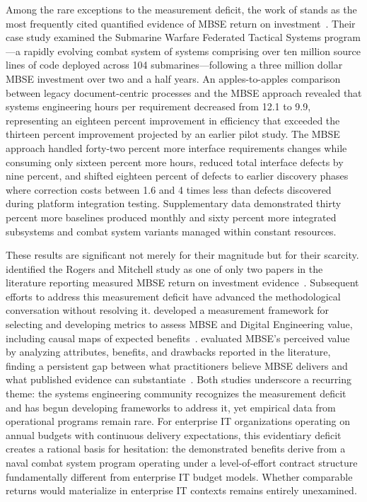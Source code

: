 Among the rare exceptions to the measurement deficit, the work of \citeauthor{Rogers_Mitchell_2021} stands as the most frequently cited quantified evidence of MBSE return on investment~\parencite{Rogers_Mitchell_2021}. Their case study examined the Submarine Warfare Federated Tactical Systems program---a rapidly evolving combat system of systems comprising over ten million source lines of code deployed across 104 submarines---following a three million dollar MBSE investment over two and a half years. An apples-to-apples comparison between legacy document-centric processes and the MBSE approach revealed that systems engineering hours per requirement decreased from 12.1 to 9.9, representing an eighteen percent improvement in efficiency that exceeded the thirteen percent improvement projected by an earlier pilot study. The MBSE approach handled forty-two percent more interface requirements changes while consuming only sixteen percent more hours, reduced total interface defects by nine percent, and shifted eighteen percent of defects to earlier discovery phases where correction costs between 1.6 and 4 times less than defects discovered during platform integration testing. Supplementary data demonstrated thirty percent more baselines produced monthly and sixty percent more integrated subsystems and combat system variants managed within constant resources.

These results are significant not merely for their magnitude but for their scarcity. \citeauthor{Henderson_Salado_2021} identified the Rogers and Mitchell study as one of only two papers in the literature reporting measured MBSE return on investment evidence~\parencite{Henderson_Salado_2021}. Subsequent efforts to address this measurement deficit have advanced the methodological conversation without resolving it. \citeauthor{Henderson_2023_Metrics} developed a measurement framework for selecting and developing metrics to assess MBSE and Digital Engineering value, including causal maps of expected benefits~\parencite{Henderson_2023_Metrics}. \citeauthor{Campo_2023} evaluated MBSE's perceived value by analyzing attributes, benefits, and drawbacks reported in the literature, finding a persistent gap between what practitioners believe MBSE delivers and what published evidence can substantiate~\parencite{Campo_2023}. Both studies underscore a recurring theme: the systems engineering community recognizes the measurement deficit and has begun developing frameworks to address it, yet empirical data from operational programs remain rare. For enterprise IT organizations operating on annual budgets with continuous delivery expectations, this evidentiary deficit creates a rational basis for hesitation: the demonstrated benefits derive from a naval combat system program operating under a level-of-effort contract structure fundamentally different from enterprise IT budget models. Whether comparable returns would materialize in enterprise IT contexts remains entirely unexamined.

